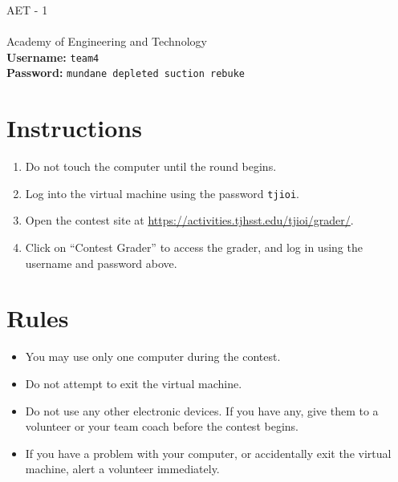 \documentclass[12pt]{article}
\begin{document}
{\Huge AET - 1}\\\\
{\Large Academy of Engineering and Technology}\\

\textbf{Username:} \verb|team4|\\
\textbf{Password:} \verb|mundane depleted suction rebuke|

\section*{Instructions}

\begin{enumerate}
    \item Do not touch the computer until the round begins.
    \item Log into the virtual machine using the password \verb|tjioi|.
    \item Open the contest site at \url{https://activities.tjhsst.edu/tjioi/grader/}.
    \item Click on ``Contest Grader'' to access the grader, and log in using the username and password above.
\end{enumerate}

\section*{Rules}

\begin{itemize}
    \item You may use only one computer during the contest.
    \item Do not attempt to exit the virtual machine.
    \item Do not use any other electronic devices. If you have any, give them to a volunteer or your team coach before the contest begins.
    \item If you have a problem with your computer, or accidentally exit the virtual machine, alert a volunteer immediately.
\end{itemize}
\end{document}
